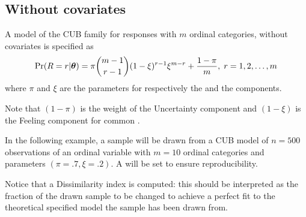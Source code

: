 \documentclass[letterpaper,10pt,english]{sphinxmanual}
\begin{document}
\subsection{Without covariates}
\label{\detokenize{manual:without-covariates}}\label{\detokenize{manual:cub-without-covariates}}
\sphinxAtStartPar
{}

\sphinxAtStartPar
A model of the CUB family for responses with \(m\) ordinal categories, without covariates is specified as
\begin{equation*}
\begin{split}\Pr(R=r|\boldsymbol{\theta}) = \pi \dbinom{m-1}{r-1}(1-\xi)^{r-1}\xi^{m-r}+\dfrac{1-\pi}{m},
\; r = 1,2,\ldots,m\end{split}
\end{equation*}
\sphinxAtStartPar
where \(\pi\) and \(\xi\) are the parameters for respectively the  and the
 components.

\sphinxAtStartPar
Note that \((1-\pi)\) is the weight of the Uncertainty component and
\((1-\xi)\) is the Feeling component for common .

\sphinxAtStartPar
In the following example, a sample will be drawn from a CUB model of \(n=500\) observations of an ordinal
variable with \(m=10\) ordinal categories
and parameters \((\pi=.7, \xi=.2)\). A  will be set to ensure reproducibility.

\sphinxAtStartPar
Notice that a Dissimilarity index is computed: this should be interpreted as the fraction of the
drawn sample to be changed to achieve a perfect fit to the theoretical specified model the sample
has been drawn from.
\def\sphinxLiteralBlockLabel{\label{\detokenize{manual:id42}}}
\begin{sphinxVerbatim}[commandchars=\\\{\},numbers=left,firstnumber=1,stepnumber=1]
   
   

  
      
     
\end{sphinxVerbatim}
\end{document}
